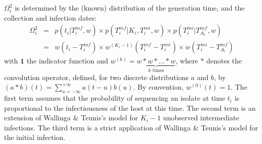 \documentclass[10pt]{article}
\begin{document}
$\Omega_i^2$ is determined by the (known) distribution of the generation time, and the collection and infection dates:
\begin{eqnarray}
 \Omega_i^2 & = & p(t_i | T_i^{inf}, w) \times p(T_i^{inf}| K_i,T_i^{ini}, w) \times p(T_i^{ini}| T_{A_i}^{inf}, w) \nonumber \\
& = &  w(t_i - T_i^{inf}) \times  w^{\left(K_i-1\right)}(T_i^{inf} - T_i^{ini}) \times w(T_i^{ini} - T_{A_i}^{inf})
\end{eqnarray}
with $\mathbf{1}$ the indicator function and $w^{\left(k\right)} = \underbrace{w*w*\ldots*w}_{k \text{ times}} $, where $*$ denotes the convolution operator, defined, for two discrete distributions $a$ and $b$, by $\left(a*b\right)\left(t\right) = \sum_{u=-\infty}^{+\infty} a\left(t-u\right)b\left(u\right)$. By convention, $w^{\left(0\right)}\left(t\right) = 1$.
The first term assumes that the probability of sequencing an isolate at time $t_i$ is proportional to the infectiousness of the host at this time.
The second term is an extension of Wallinga \& Teunis's model for $K_i-1$ unobserved intermediate infections.
The third term is a strict application of Wallinga \& Teunis's model for the initial infection.
\\
\end{document}
